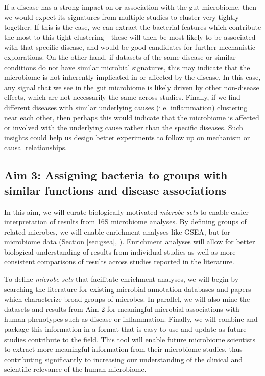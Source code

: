 \documentclass[12pt]{article}
\begin{document}
If a disease has a strong impact on or association with the gut 
microbiome, then we would expect its signatures from multiple studies 
to cluster very tightly together. If this is the case, we can extract 
the bacterial features which contribute the most to this tight 
clustering - these will then be most likely to be associated with that 
specific disease, and would be good candidates for further mechanistic 
explorations. On the other hand, if datasets of the same disease or 
similar conditions do not have similar microbial signatures, this may 
indicate that the microbiome is not inherently implicated in or affected 
by the disease. In this case, any signal that we see in the gut 
microbiome is likely driven by other non-disease effects, which are 
not necessarily the same across studies. Finally, if we find different 
diseases with similar underlying causes (i.e. inflammation) clustering 
near each other, then perhaps this would indicate that the microbiome 
is affected or involved with the underlying cause rather than the 
specific diseases. Such insights could help us design better 
experiments to follow up on mechanism or causal relationships.

\subsection{Aim 3: Assigning bacteria to groups with similar functions and disease associations}

In this aim, we will curate biologically-motivated \textit{microbe 
sets} to enable easier interpretation of results from 16S microbiome 
analyses. By defining groups of related microbes, we 
will enable enrichment analyses like GSEA, but for microbiome data (Section \ref{sec:gsea}, 
\cite{subramanian-gsea-2005}). Enrichment analyses will allow for better 
biological understanding of results from individual studies as well as 
more consistent comparisons of results across studies reported in 
the literature.

To define \textit{microbe sets} that facilitate enrichment analyses, we will
begin by searching the literature for existing microbial annotation
databases and papers which characterize broad groups of microbes.
In parallel, we will also mine the datasets and results from Aim 2
for meaningful microbial associations with human phenotypes such as
disease or inflammation. Finally, we will combine and package this information
in a format that is easy to use and update as future studies contribute
to the field. This tool will enable future microbiome scientists to extract more
meaningful information from their microbiome studies, thus
contributing significantly to increasing our understanding of the
clinical and scientific relevance of the human microbiome.
\end{document}
